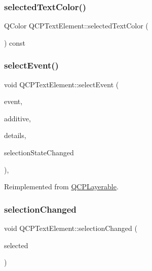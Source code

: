 \subsubsection{\texorpdfstring{selectedTextColor()}{selectedTextColor()}}
{\footnotesize\ttfamily Q\+Color Q\+C\+P\+Text\+Element\+::selected\+Text\+Color (\begin{DoxyParamCaption}{ }\end{DoxyParamCaption}) const\hspace{0.3cm}{\ttfamily [inline]}}

\mbox{\label{class_q_c_p_text_element_a8d696ea82fa7bf743e01858039c03525}} 
\subsubsection{\texorpdfstring{selectEvent()}{selectEvent()}}
{\footnotesize\ttfamily void Q\+C\+P\+Text\+Element\+::select\+Event (\begin{DoxyParamCaption}\item[{Q\+Mouse\+Event $\ast$}]{event,  }\item[{bool}]{additive,  }\item[{const Q\+Variant \&}]{details,  }\item[{bool $\ast$}]{selection\+State\+Changed }\end{DoxyParamCaption})\hspace{0.3cm}{\ttfamily [protected]}, {\ttfamily [virtual]}}



Reimplemented from \mbox{\hyperlink{class_q_c_p_layerable_a7498c2d0d081cf7cad0fb3bb93aa0e91}{Q\+C\+P\+Layerable}}.

\mbox{\label{class_q_c_p_text_element_a49f45b87ee9c1fe866c2cdd12af17a9a}} 
\subsubsection{\texorpdfstring{selectionChanged}{selectionChanged}}
{\footnotesize\ttfamily void Q\+C\+P\+Text\+Element\+::selection\+Changed (\begin{DoxyParamCaption}\item[{bool}]{selected }\end{DoxyParamCaption})\hspace{0.3cm}{\ttfamily [signal]}}

